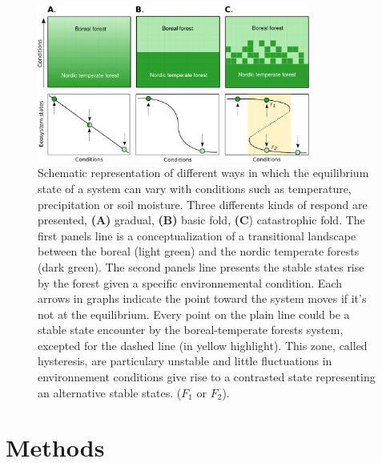 \begin{figure}[ht]       
\begin{center}
	\includegraphics[width=0.8\textwidth]{fig/states.pdf}       
\end{center}
\caption{Schematic representation of different ways in which the equilibrium
state of a system can vary with conditions such as temperature, precipitation
or soil moisture. Three differents kinds of respond are presented,
\textbf{(A)} gradual, \textbf{(B)} basic fold, \textbf{(C}) catastrophic fold.
The first panels line is a conceptualization of a transitional landscape
between the boreal (light green) and the nordic temperate forests (dark
green). The second panels line presents the stable states rise by the forest
given a specific environnemental condition. Each arrows in graphs indicate the
point toward the system moves if it's not at the equilibrium. Every point on
the plain line could be a stable state encounter by the boreal-temperate
forests system, excepted for the dashed line (in yellow highlight). This zone,
called hysteresis, are particulary unstable and little fluctuations in
environnement conditions give rise to a contrasted state representing an
alternative stable states.  ($F_1$ or $F_2$).}


\label{fig1}
\end{figure}

\section{Methods}   

